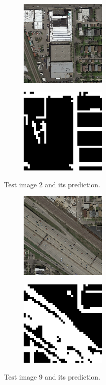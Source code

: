 \documentclass[10pt,conference,compsocconf]{IEEEtran}
\begin{document}
\begin{figure}[H]
	\centering
	\begin{subfigure}[htb]{0.2\textwidth}
		\includegraphics[width=4.2cm]{images/visualize_pred/images/test_2.png}
		\label{fig:test2}
	\end{subfigure}
	\hspace{1.5em}
	\begin{subfigure}[htb]{0.2\textwidth}
		\includegraphics[width=4.2cm]{images/visualize_pred/groundtruth/pred_2.png}
		\label{fig:pred2}
	\end{subfigure}
	\caption{Test image 2 and its prediction.}
\end{figure}

\begin{figure}[H]
	\centering
	\begin{subfigure}[htb]{0.2\textwidth}
		\includegraphics[width=4.2cm]{images/visualize_pred/images/test_9.png}
		\label{fig:test9}
	\end{subfigure}
	\hspace{1.5em}
	\begin{subfigure}[htb]{0.2\textwidth}
		\includegraphics[width=4.2cm]{images/visualize_pred/groundtruth/pred_9.png}
		\label{fig:pred9}
	\end{subfigure}
	\caption{Test image 9 and its prediction.}
\end{figure}
\end{document}
